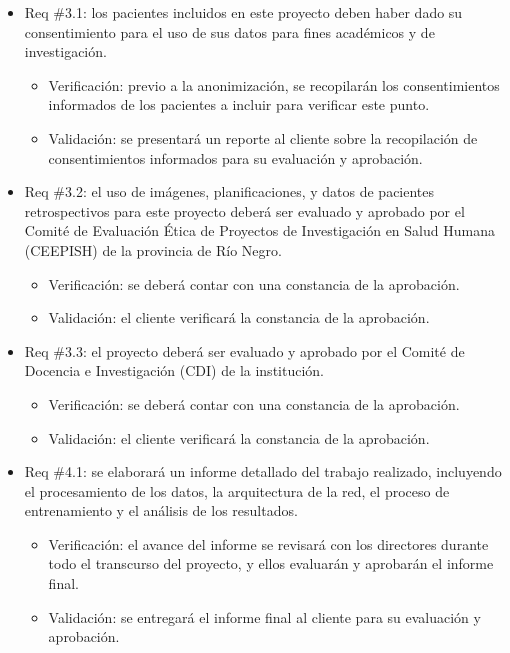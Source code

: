 \documentclass[
11pt, %
codirector, %
]{charter}
\begin{document}
\begin{itemize}
\item Req \#3.1: los pacientes incluidos en este proyecto deben haber dado su consentimiento para el uso de sus datos para fines académicos y de investigación.

\begin{itemize}
	\item Verificación: previo a la anonimización, se recopilarán los consentimientos informados de los pacientes a incluir para verificar este punto.
	\item Validación: se presentará un reporte al cliente sobre la recopilación de consentimientos informados para su evaluación y aprobación.
\end{itemize}

\item Req \#3.2: el uso de imágenes, planificaciones, y datos de pacientes retrospectivos para este proyecto deberá ser evaluado y aprobado por el Comité de Evaluación Ética de Proyectos de Investigación en Salud Humana (CEEPISH) de la provincia de Río Negro.

\begin{itemize}
	\item Verificación: se deberá contar con una constancia de la aprobación.
	\item Validación: el cliente verificará la constancia de la aprobación.  
\end{itemize}

\item Req \#3.3: el proyecto deberá ser evaluado y aprobado por el Comité de Docencia e Investigación (CDI) de la institución.

\begin{itemize}
	\item Verificación: se deberá contar con una constancia de la aprobación.
	\item Validación: el cliente verificará la constancia de la aprobación.  
\end{itemize}

\item Req \#4.1: se elaborará un informe detallado del trabajo realizado, incluyendo el procesamiento de los datos, la arquitectura de la red, el proceso de entrenamiento y el análisis de los resultados.

\begin{itemize}
	\item Verificación: el avance del informe se revisará con los directores durante todo el transcurso del proyecto, y ellos evaluarán y aprobarán el informe final.
	\item Validación: se entregará el informe final al cliente para su evaluación y aprobación.  
\end{itemize}


\end{itemize}
\end{document}
